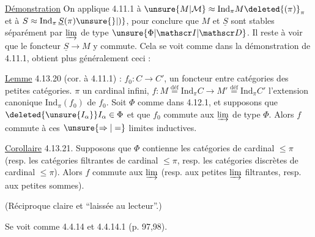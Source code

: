 
\uline{Démonstration} On applique 4.11.1   à $\unsure{M|\mathcal M}\approx\mathrm{Ind}_\pi M\deleted{(\pi)}_\pi$ et à $S\approx\mathrm{Ind}_\pi\,\underline S(\pi)\unsure{\}|)}$, pour conclure que $M$ et $\underline S$ sont stables séparément par $\varinjlim$ de type $\unsure{\Phi|\mathscr I|\mathscr D}$. Il reste à voir que le foncteur $\underline S\longrightarrow M$ y commute. Cela se voit comme dans la démonstration de 4.11.1,  obtient plus généralement ceci :

\uline{Lemme} 4.13.20 (cor. à 4.11.1) :  $f_0:C\longrightarrow C'$, un foncteur entre catégories  des petites catégories. $\pi$ un cardinal infini, $f:M\overset{\text{déf}}{=}\mathrm{Ind}_\pi C\longrightarrow M'\overset{\text{déf}}{=}\mathrm{Ind}_\pi C'$
l'extension canonique $\mathrm{Ind}_\pi(f_0)$ de $f_0$. Soit $\Phi$  comme dans 4.12.1, et supposons que $\deleted{\unsure{I_\alpha}}I_\alpha\in\Phi$ et que $f_0$ commute aux $\varinjlim$ de type $\Phi$. Alors $f$ commute à ces $\unsure{\Rightarrow|=}$ limites inductives.

\uline{Corollaire} 4.13.21.  Supposons que $\Phi$ contienne les catégories de cardinal $\leq\pi$ (resp. les catégories filtrantes de cardinal $\leq\pi$,  resp. les catégories discrètes de cardinal $\leq\pi$). Alors $f$ commute aux  $\varinjlim$  (resp. aux petites $\varinjlim$ filtrantes,  resp. aux petites sommes).

(Réciproque claire et ``laissée au lecteur''.)

Se voit comme 4.4.14 et 4.4.14.1 (p. 97,98).


